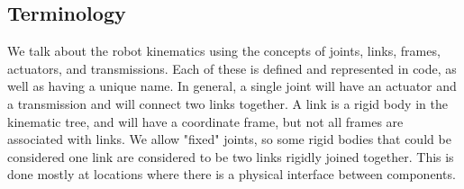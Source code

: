 \subsection{Terminology}
We talk about the robot kinematics using the concepts of joints, links, frames, actuators, and transmissions.  Each of these is defined and represented in code, as well as having a unique name.  In general, a single joint will have an actuator and a transmission and will connect two links together.  A link is a rigid body in the kinematic tree, and will have a coordinate frame, but not all frames are associated with links.  We allow "fixed" joints, so some rigid bodies that could be considered one link are considered to be two links rigidly joined together.  This is done mostly at locations where there is a physical interface between components.

